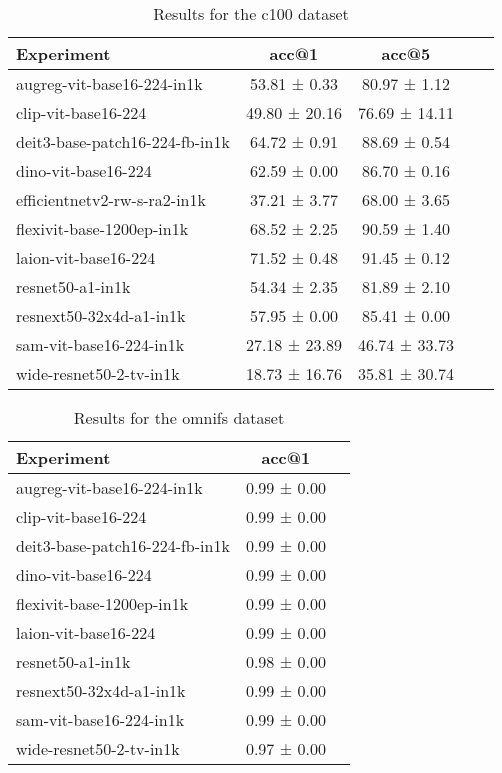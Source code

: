 \begin{table}[htbp]
\caption{Results for the c100 dataset}
\begin{tabular}{|l|c|c|c|c|}\hline
Experiment & acc@1 & acc@5\\
\hline
augreg-vit-base16-224-in1k & 53.81 ± 0.33 & 80.97 ± 1.12\\
\hline
clip-vit-base16-224 & 49.80 ± 20.16 & 76.69 ± 14.11\\
\hline
deit3-base-patch16-224-fb-in1k & 64.72 ± 0.91 & 88.69 ± 0.54\\
\hline
dino-vit-base16-224 & 62.59 ± 0.00 & 86.70 ± 0.16\\
\hline
efficientnetv2-rw-s-ra2-in1k & 37.21 ± 3.77 & 68.00 ± 3.65\\
\hline
flexivit-base-1200ep-in1k & 68.52 ± 2.25 & 90.59 ± 1.40\\
\hline
laion-vit-base16-224 & 71.52 ± 0.48 & 91.45 ± 0.12\\
\hline
resnet50-a1-in1k & 54.34 ± 2.35 & 81.89 ± 2.10\\
\hline
resnext50-32x4d-a1-in1k & 57.95 ± 0.00 & 85.41 ± 0.00\\
\hline
sam-vit-base16-224-in1k & 27.18 ± 23.89 & 46.74 ± 33.73\\
\hline
wide-resnet50-2-tv-in1k & 18.73 ± 16.76 & 35.81 ± 30.74\\
\hline
\end{tabular}
\end{table}

\begin{table}[htbp]
\caption{Results for the omnifs dataset}
\begin{tabular}{|l|c|c|}\hline
Experiment & acc@1\\
\hline
augreg-vit-base16-224-in1k & 0.99 ± 0.00\\
\hline
clip-vit-base16-224 & 0.99 ± 0.00\\
\hline
deit3-base-patch16-224-fb-in1k & 0.99 ± 0.00\\
\hline
dino-vit-base16-224 & 0.99 ± 0.00\\
\hline
flexivit-base-1200ep-in1k & 0.99 ± 0.00\\
\hline
laion-vit-base16-224 & 0.99 ± 0.00\\
\hline
resnet50-a1-in1k & 0.98 ± 0.00\\
\hline
resnext50-32x4d-a1-in1k & 0.99 ± 0.00\\
\hline
sam-vit-base16-224-in1k & 0.99 ± 0.00\\
\hline
wide-resnet50-2-tv-in1k & 0.97 ± 0.00\\
\hline
\end{tabular}
\end{table}

